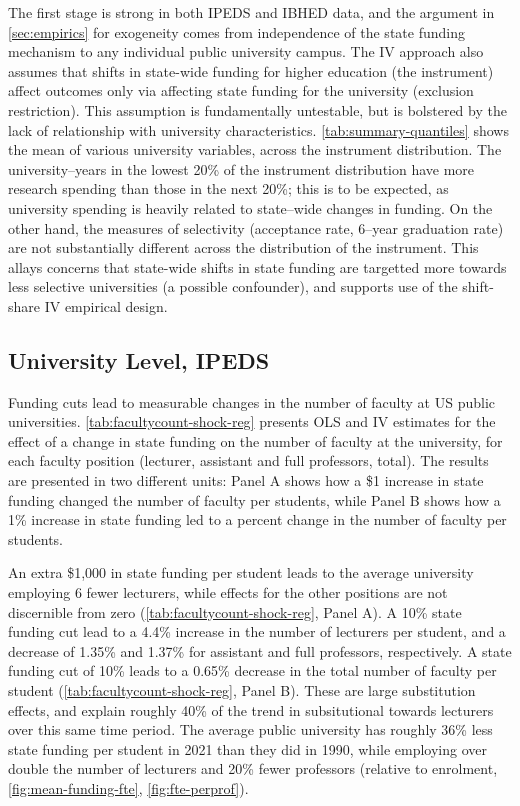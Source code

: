 The first stage is strong in both IPEDS and IBHED data, and the argument in \autoref{sec:empirics} for exogeneity comes from independence of the state funding mechanism to any individual public university campus.
The IV approach also assumes that shifts in state-wide funding for higher education (the instrument) affect outcomes only via affecting state funding for the university (exclusion restriction).
This assumption is fundamentally untestable, but is bolstered by the lack of relationship with university characteristics.
\autoref{tab:summary-quantiles} shows the mean of various university variables, across the instrument distribution.
The university--years in the lowest 20\% of the instrument distribution have more research spending than those in the next 20\%; this is to be expected, as university spending is heavily related to state--wide changes in funding.
On the other hand, the measures of selectivity (acceptance rate, 6--year graduation rate) are not substantially different across the distribution of the instrument.
This allays concerns that state-wide shifts in state funding are targetted more towards less selective universities (a possible confounder), and supports use of the shift-share IV empirical design.

\subsection{University Level, IPEDS}
Funding cuts lead to measurable changes in the number of faculty at US public universities.
\autoref{tab:facultycount-shock-reg} presents OLS and IV estimates for the effect of a change in state funding on the number of faculty at the university, for each faculty position (lecturer, assistant and full professors, total).
The results are presented in two different units: Panel A shows how a \$1 increase in state funding changed the number of faculty per students, while Panel B shows how a 1\% increase in state funding led to a percent change in the number of faculty per students.

An extra \$1,000 in state funding per student leads to the average university employing 6 fewer lecturers, while effects for the other positions are not discernible from zero (\autoref{tab:facultycount-shock-reg}, Panel A).
A 10\% state funding cut lead to a 4.4\% increase in the number of lecturers per student, and a decrease of 1.35\% and 1.37\% for assistant and full professors, respectively.
A state funding cut of 10\% leads to a 0.65\% decrease in the total number of faculty per student (\autoref{tab:facultycount-shock-reg}, Panel B).
These are large substitution effects, and explain roughly 40\% of the trend in subsitutional towards lecturers over this same time period.
The average public university has roughly 36\% less state funding per student in 2021 than they did in 1990, while employing over double the number of lecturers and 20\% fewer professors (relative to enrolment, \autoref{fig:mean-funding-fte}, \ref{fig:fte-perprof}).


